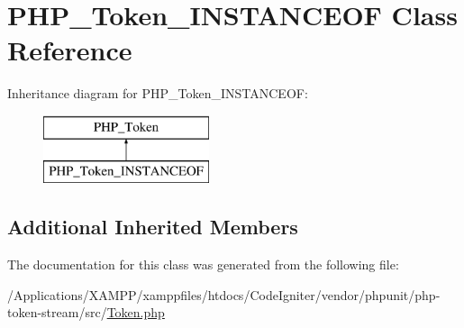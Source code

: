 \hypertarget{class_p_h_p___token___i_n_s_t_a_n_c_e_o_f}{}\section{P\+H\+P\+\_\+\+Token\+\_\+\+I\+N\+S\+T\+A\+N\+C\+E\+OF Class Reference}
\label{class_p_h_p___token___i_n_s_t_a_n_c_e_o_f}
Inheritance diagram for P\+H\+P\+\_\+\+Token\+\_\+\+I\+N\+S\+T\+A\+N\+C\+E\+OF\+:\begin{figure}[H]
\begin{center}
\leavevmode
\includegraphics[height=2.000000cm]{class_p_h_p___token___i_n_s_t_a_n_c_e_o_f}
\end{center}
\end{figure}
\subsection*{Additional Inherited Members}


The documentation for this class was generated from the following file\+:\begin{DoxyCompactItemize}
\item 
/\+Applications/\+X\+A\+M\+P\+P/xamppfiles/htdocs/\+Code\+Igniter/vendor/phpunit/php-\/token-\/stream/src/\mbox{\hyperlink{_token_8php}{Token.\+php}}\end{DoxyCompactItemize}
